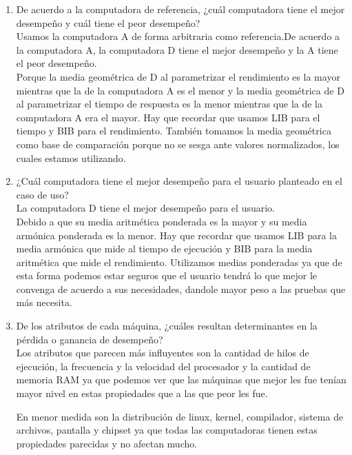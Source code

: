 \documentclass{article}
\begin{document}
\begin{enumerate}
{        }
       
       
        \item {
        De acuerdo a la computadora de referencia, ¿cuál computadora tiene el
mejor desempeño y cuál tiene el peor desempeño? \\
			Usamos la computadora A de forma arbitraria como referencia.De acuerdo a la computadora A, la computadora D tiene el mejor desempeño y la A tiene el peor desempeño.\\
			
			Porque la media geométrica de D al parametrizar el rendimiento es la mayor mientras que la de la computadora A es el menor y la media geométrica de D al parametrizar el tiempo de respuesta es la menor mientras que la de la computadora A era el mayor. Hay que recordar que usamos LIB para el tiempo y BIB para el rendimiento. También tomamos la media geométrica como base de comparación porque no se sesga ante valores normalizados, los cuales estamos utilizando.\\
        }
        
        \item {
            ¿Cuál computadora tiene el mejor desempeño para el usuario planteado
            en el caso de uso? \\
            La computadora D tiene el mejor desempeño para el usuario.\\
            
          Debido a que su media aritmética ponderada es la mayor y su media armónica ponderada es la menor. Hay que recordar que usamos LIB para la media armónica que mide al tiempo de ejecución y BIB para la media aritmética que mide el rendimiento. Utilizamos medias ponderadas ya que de esta forma podemos estar seguros que el usuario tendrá lo que mejor le convenga de acuerdo a sus necesidades, dandole mayor peso a las pruebas que más necesita.\\
        }
        
        \item {
            De los atributos de cada máquina, ¿cuáles resultan determinantes en 
            la pérdida o ganancia de desempeño? \\
            Los atributos que parecen más influyentes son la cantidad de hilos 
            de ejecución, la frecuencia y la velocidad del procesador y la cantidad de memoria RAM ya que podemos ver que las máquinas que mejor les fue tenían mayor nivel en estas propiedades que a las que peor les fue.
            
            En menor medida son la distribución de linux, kernel, compilador, sistema de archivos, pantalla y chipset ya que todas las computadoras tienen estas propiedades parecidas y no afectan mucho.
        }
    \end{enumerate}
    
\end{document}
